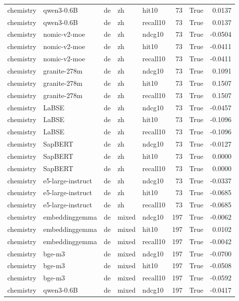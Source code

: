\begin{tabular}{lllllrrr}
chemistry & qwen3-0.6B & de & zh & hit10 & 73 & True & 0.0137 \\
chemistry & qwen3-0.6B & de & zh & recall10 & 73 & True & 0.0137 \\
chemistry & nomic-v2-moe & de & zh & ndcg10 & 73 & True & -0.0504 \\
chemistry & nomic-v2-moe & de & zh & hit10 & 73 & True & -0.0411 \\
chemistry & nomic-v2-moe & de & zh & recall10 & 73 & True & -0.0411 \\
chemistry & granite-278m & de & zh & ndcg10 & 73 & True & 0.1091 \\
chemistry & granite-278m & de & zh & hit10 & 73 & True & 0.1507 \\
chemistry & granite-278m & de & zh & recall10 & 73 & True & 0.1507 \\
chemistry & LaBSE & de & zh & ndcg10 & 73 & True & -0.0457 \\
chemistry & LaBSE & de & zh & hit10 & 73 & True & -0.1096 \\
chemistry & LaBSE & de & zh & recall10 & 73 & True & -0.1096 \\
chemistry & SapBERT & de & zh & ndcg10 & 73 & True & -0.0127 \\
chemistry & SapBERT & de & zh & hit10 & 73 & True & 0.0000 \\
chemistry & SapBERT & de & zh & recall10 & 73 & True & 0.0000 \\
chemistry & e5-large-instruct & de & zh & ndcg10 & 73 & True & -0.0337 \\
chemistry & e5-large-instruct & de & zh & hit10 & 73 & True & -0.0685 \\
chemistry & e5-large-instruct & de & zh & recall10 & 73 & True & -0.0685 \\
chemistry & embeddinggemma & de & mixed & ndcg10 & 197 & True & -0.0062 \\
chemistry & embeddinggemma & de & mixed & hit10 & 197 & True & 0.0102 \\
chemistry & embeddinggemma & de & mixed & recall10 & 197 & True & -0.0042 \\
chemistry & bge-m3 & de & mixed & ndcg10 & 197 & True & -0.0700 \\
chemistry & bge-m3 & de & mixed & hit10 & 197 & True & -0.0508 \\
chemistry & bge-m3 & de & mixed & recall10 & 197 & True & -0.0592 \\
chemistry & qwen3-0.6B & de & mixed & ndcg10 & 197 & True & -0.0417 \\

\end{tabular}

